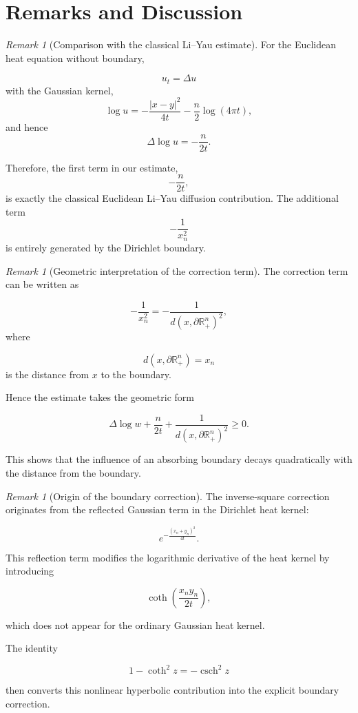 \documentclass[11pt]{amsart}
\DeclareMathOperator{\csch}{csch}
\theoremstyle{definition}
\theoremstyle{remark}
\newtheorem{remark}[theorem]{Remark}
\begin{document}
\section{Remarks and Discussion}


\begin{remark}[Comparison with the classical Li--Yau estimate]

For the Euclidean heat equation without boundary,

\[
u_t=\Delta u
\]
with the Gaussian kernel,
\[
\log u
=
-\frac{|x-y|^2}{4t}
-\frac n2\log(4\pi t),
\]
and hence
\[
\Delta\log u
=
-\frac n{2t}.
\]

Therefore, the first term in our estimate,
\[
-\frac n{2t},
\]
is exactly the classical Euclidean Li--Yau diffusion contribution. The additional term
\[
-\frac1{x_n^2}
\]
is entirely generated by the Dirichlet boundary.

\end{remark}



\begin{remark}[Geometric interpretation of the correction term]

The correction term can be written as

\[
-\frac1{x_n^2}
=
-\frac1{
d(x,\partial\mathbb R^n_+)^2
},
\]
where

\[
d(x,\partial\mathbb R^n_+)=x_n
\]
is the distance from $x$ to the boundary.

Hence the estimate takes the geometric form

\[
\Delta\log w
+
\frac n{2t}
+
\frac1{
d(x,\partial\mathbb R^n_+)^2
}
\geq0 .
\]

This shows that the influence of an absorbing boundary decays
quadratically with the distance from the boundary.

\end{remark}



\begin{remark}[Origin of the boundary correction]

The inverse-square correction originates from the reflected Gaussian
term in the Dirichlet heat kernel:

\[
e^{-\frac{(x_n+y_n)^2}{4t}}.
\]

This reflection term modifies the logarithmic derivative of the heat
kernel by introducing

\[
\coth
\left(
\frac{x_ny_n}{2t}
\right),
\]

which does not appear for the ordinary Gaussian heat kernel.

The identity

\[
1-\coth^2 z
=
-\csch^2 z
\]

then converts this nonlinear hyperbolic contribution into the
explicit boundary correction.

\end{remark}
\end{document}
